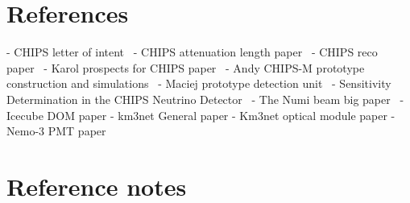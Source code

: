 \section{References}


- CHIPS letter of intent~\cite{adamson2013}
- CHIPS attenuation length paper~\cite{amat2017}
- CHIPS reco paper~\cite{blake2016}
- Karol prospects for CHIPS paper~\cite{lang2015}
- Andy CHIPS-M prototype construction and simulations~\cite{perch2015}
- Maciej prototype detection unit~\cite{pfutzner2017}
- Sensitivity Determination in the CHIPS Neutrino Detector~\cite{adde2016}
- The Numi beam big paper~\cite{adamson2016}
- Icecube DOM paper
- km3net General paper
- Km3net optical module paper
- Nemo-3 PMT paper


\section{Reference notes}

